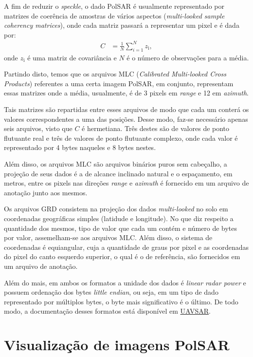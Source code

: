 \documentclass[12pt]{article}
\begin{document}
A fim de reduzir o \textit{speckle}\cite{Deng17}, o dado PolSAR é usualmente representado por matrizes de coerência de amostras de vários aspectos (\textit{multi-looked sample coherency matrices}), onde cada matriz passará a representar um pixel e é dada por:
\begin{align*}
C &= \frac{1}{N}\sum_{i = 1}^{N} z_\text{i},
\end{align*}
onde $z_\text{i}$ é uma matriz de covariância e $N$ é o número de observações para a média.

Partindo disto, temos que os arquivos MLC (\textit{Calibrated Multi-looked Cross Products}) referentes a uma certa imagem PolSAR, em conjunto, representam essas matrizes onde a média, usualmente, é de 3 pixels em \textit{range} e 12 em \textit{azimuth}. 

Tais matrizes são repartidas entre esses arquivos de modo que cada um conterá os valores correspondentes a uma das posições. Desse modo, faz-se necessário apenas seis arquivos, visto que $C$ é hermetiana. Três destes são de valores de ponto flutuante real e três de valores de ponto flutuante complexo, onde cada valor é representado por 4 bytes naqueles e 8 bytes nestes.

Além disso, os arquivos MLC são arquivos binários puros sem cabeçalho, a projeção de seus dados é a de alcance inclinado natural e o espaçamento, em metros, entre os pixels nas direções \textit{range} e \textit{azimuth} é fornecido em um arquivo de anotação junto aos mesmos.

Os arquivos GRD consistem na projeção dos dados \textit{multi-looked} no solo em coordenadas geográficas simples (latidude e longitude). No que diz respeito a quantidade dos mesmos, tipo de valor que cada um contém e número de bytes por valor, assemelham-se aos arquivos MLC. Além disso, o sistema de coordenadas é equiangular, cuja a quantidade de graus por pixel e as coordenadas do pixel do canto esquerdo superior, o qual é o de referência, são fornecidos em um arquivo de anotação.

Além do mais, em ambos os formatos a unidade dos dados é \textit{linear radar power} e possuem ordenação dos bytes \textit{little endian}, ou seja, em um tipo de dado representado por múltiplos bytes, o byte mais significativo é o último. De todo modo, a documentação desses formatos está disponível em \href{https://uavsar.jpl.nasa.gov/science/documents/polsar-format.html}{UAVSAR}.

\section{Visualização de imagens PolSAR}
\end{document}
